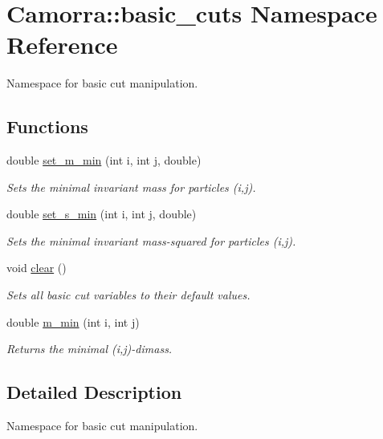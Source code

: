 \hypertarget{a00801}{
\section{Camorra::basic\_\-cuts Namespace Reference}
\label{a00801}
}


Namespace for basic cut manipulation.  


\subsection*{Functions}
\begin{DoxyCompactItemize}
\item 
double \hyperlink{a00801_a64e8d156b26722a73eb4bcc7b805b469}{set\_\-m\_\-min} (int i, int j, double)
\begin{DoxyCompactList}\small\item\em Sets the minimal invariant mass for particles (i,j). \end{DoxyCompactList}\item 
double \hyperlink{a00801_a7345eaf023667a334f5be702df0ff369}{set\_\-s\_\-min} (int i, int j, double)
\begin{DoxyCompactList}\small\item\em Sets the minimal invariant mass-\/squared for particles (i,j). \end{DoxyCompactList}\item 
\hypertarget{a00801_ab46d99e27f4cbe70c6ff3c21511d6d67}{
void \hyperlink{a00801_ab46d99e27f4cbe70c6ff3c21511d6d67}{clear} ()}
\label{a00801_ab46d99e27f4cbe70c6ff3c21511d6d67}

\begin{DoxyCompactList}\small\item\em Sets all basic cut variables to their default values. \end{DoxyCompactList}\item 
\hypertarget{a00801_ad683c0d55b937953163afccc3870210a}{
double \hyperlink{a00801_ad683c0d55b937953163afccc3870210a}{m\_\-min} (int i, int j)}
\label{a00801_ad683c0d55b937953163afccc3870210a}

\begin{DoxyCompactList}\small\item\em Returns the minimal (i,j)-\/dimass. \end{DoxyCompactList}\end{DoxyCompactItemize}


\subsection{Detailed Description}
Namespace for basic cut manipulation. 

